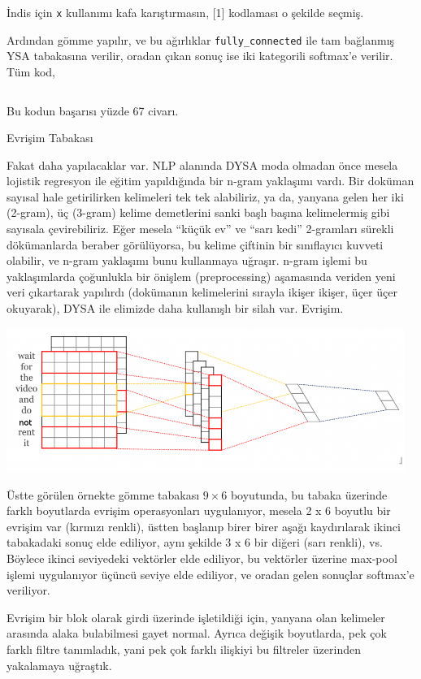 \documentclass[12pt,fleqn]{article}\usepackage{../../common}
\begin{document}
İndis için \verb!x! kullanımı kafa karıştırmasın, [1] kodlaması o şekilde
seçmiş.

Ardından gömme yapılır, ve bu ağırlıklar \verb!fully_connected! ile tam
bağlanmış YSA tabakasına verilir, oradan çıkan sonuç ise iki kategorili
softmax'e verilir. Tüm kod,

\inputminted[fontsize=\footnotesize]{python}{nlp1.py}

Bu kodun başarısı yüzde 67 civarı. 

Evrişim Tabakası

Fakat daha yapılacaklar var. NLP alanında DYSA moda olmadan önce mesela
lojistik regresyon ile eğitim yapıldığında bir n-gram yaklaşımı vardı. Bir
doküman sayısal hale getirilirken kelimeleri tek tek alabiliriz, ya da,
yanyana gelen her iki (2-gram), üç (3-gram) kelime demetlerini sanki başlı
başına kelimelermiş gibi sayısala çevirebiliriz. Eğer mesela ``küçük ev''
ve ``sarı kedi'' 2-gramları sürekli dökümanlarda beraber görülüyorsa, bu
kelime çiftinin bir sınıflayıcı kuvveti olabilir, ve n-gram yaklaşımı bunu
kullanmaya uğraşır. n-gram işlemi bu yaklaşımlarda çoğunlukla bir önişlem
(preprocessing) aşamasında veriden yeni veri çıkartarak yapılırdı
(dokümanın kelimelerini sırayla ikişer ikişer, üçer üçer okuyarak), DYSA
ile elimizde daha kullanışlı bir silah var. Evrişim.

\includegraphics[width=35em]{nlp_01.png}

Üstte görülen örnekte gömme tabakası $9 \times 6$ boyutunda, bu tabaka
üzerinde farklı boyutlarda evrişim operasyonları uygulanıyor, mesela 2 x 6
boyutlu bir evrişim var (kırmızı renkli), üstten başlanıp birer birer aşağı
kaydırılarak ikinci tabakadaki sonuç elde ediliyor, aynı şekilde 3 x 6 bir
diğeri (sarı renkli), vs. Böylece ikinci seviyedeki vektörler elde
ediliyor, bu vektörler üzerine max-pool işlemi uygulanıyor üçüncü seviye
elde ediliyor, ve oradan gelen sonuçlar softmax'e veriliyor.

Evrişim bir blok olarak girdi üzerinde işletildiği için, yanyana olan
kelimeler arasında alaka bulabilmesi gayet normal. Ayrıca değişik
boyutlarda, pek çok farklı filtre tanımladık, yani pek çok farklı ilişkiyi
bu filtreler üzerinden yakalamaya uğraştık.
\end{document}
